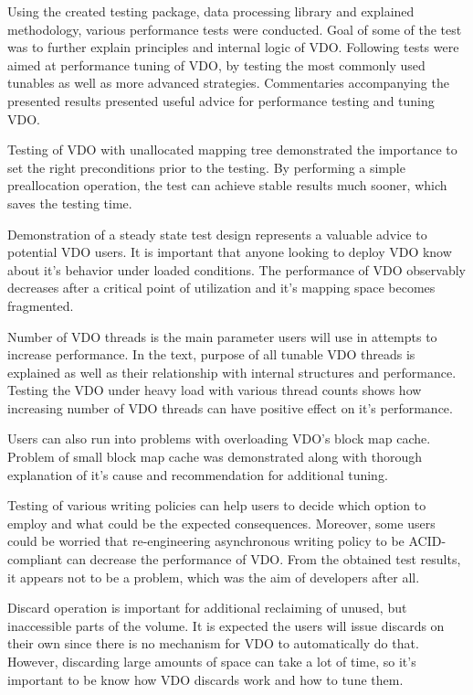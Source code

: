 \documentclass[
  color, %
  table, %
  lof,   %
  lot,   %
]{fithesis3}
\begin{document}
Using the created testing package, data processing library and explained methodology, various performance tests were conducted. Goal of some of the test was to further explain principles and internal logic of VDO. Following tests were aimed at performance tuning of VDO, by testing the most commonly used tunables as well as more advanced strategies. Commentaries accompanying the presented results presented useful advice for performance testing and tuning VDO.

Testing of VDO with unallocated mapping tree demonstrated the importance to set the right preconditions prior to the testing. By performing a simple preallocation operation, the test can achieve stable results much sooner, which saves the testing time.

Demonstration of a steady state test design represents a valuable advice to potential VDO users. It is important that anyone looking to deploy VDO know about it's behavior under loaded conditions. The performance of VDO observably decreases after a critical point of utilization and it's mapping space becomes fragmented.

Number of VDO threads is the main parameter users will use in attempts to increase performance. In the text, purpose of all tunable VDO threads is explained as well as their relationship with internal structures and performance. Testing the VDO under heavy load with various thread counts shows how increasing number of VDO threads can have positive effect on it's performance.

Users can also run into problems with overloading VDO's block map cache. Problem of small block map cache was demonstrated along with thorough explanation of it's cause and recommendation for additional tuning.

Testing of various writing policies can help users to decide which option to employ and what could be the expected consequences. Moreover, some users could be worried that re-engineering asynchronous writing policy to be ACID-compliant can decrease the performance of VDO. From the obtained test results, it appears not to be a problem, which was the aim of developers after all.


Discard operation is important for additional reclaiming of unused, but inaccessible parts of the volume. It is expected the users will issue discards on their own since there is no mechanism for VDO to automatically do that. However, discarding large amounts of space can take a lot of time, so it's important to be know how VDO discards work and how to tune them.
\end{document}
